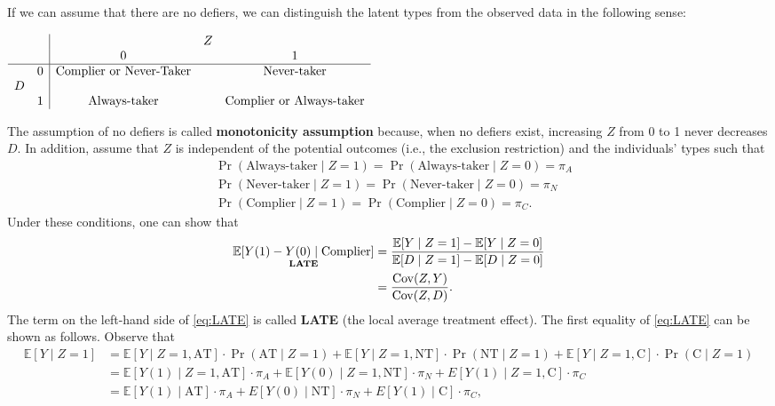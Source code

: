 \documentclass[10.5pt, A4paper, openany, uplatex]{book}
\newcommand{\E}{\mathbb{E}}
\newcommand{\Cov}{\mathrm{Cov}}
\numberwithin{equation}{section}
\begin{document}
If we can assume that there are no defiers, we can distinguish the latent types from the observed data in the following sense: 
\begin{center}
	$
	\begin{array}
	[c]{cc|ccc}
	&  &  & Z & \\
	&  & 0 &  & 1\\\hline
	& 0 & \text{Complier or Never-Taker} &  & \text{Never-taker}\\
	D &  &  &  & \\
	& 1 & \text{Always-taker} &  & \text{Complier or Always-taker}
	\end{array}
	$
\end{center}
The assumption of no defiers is called \textbf{monotonicity assumption} because, when no defiers exist, increasing $Z$ from 0 to 1 never decreases $D$.
In addition, assume that $Z$ is independent of the potential outcomes (i.e., the exclusion restriction) and the individuals' types such that
\begin{align*}
	& \Pr(\text{Always-taker} \mid Z = 1) = \Pr(\text{Always-taker} \mid Z = 0) = \pi_A\\
	& \Pr(\text{Never-taker} \mid Z = 1) = \Pr(\text{Never-taker} \mid Z = 0) = \pi_N\\
	& \Pr(\text{Complier} \mid Z = 1) = \Pr(\text{Complier} \mid Z = 0) = \pi_C.
\end{align*}
Under these conditions, one can show that
\begin{align}\label{eq:LATE}
\begin{split}
	\underset{\text{\bf LATE}}{\E[Y(1) - Y(0) \mid \text{Complier}]} 
	& = \frac{\E[Y \mid Z = 1] - \E[Y \mid Z = 0]}{\E[D \mid Z = 1] - \E[D \mid Z = 0]}\\
	& = \frac{\Cov(Z, Y)}{\Cov(Z, D)}.
\end{split}
\end{align}
The term on the left-hand side of \eqref{eq:LATE} is called \textbf{LATE} (the local average treatment effect).
The first equality of \eqref{eq:LATE} can be shown as follows.
Observe that
\small{\begin{align*}
	\E[Y \mid Z = 1 ] 
	& = \E[Y \mid Z = 1, \text{AT} ] \cdot \Pr(\text{AT} \mid Z = 1) + \E[Y \mid Z = 1, \text{NT} ] \cdot \Pr(\text{NT} \mid Z = 1) + \E[Y \mid Z = 1, \text{C} ] \cdot \Pr(\text{C} \mid Z = 1)\\
	& = \E[Y(1) \mid Z = 1, \text{AT} ] \cdot \pi_A + \E[Y(0) \mid Z = 1, \text{NT} ] \cdot \pi_N + E[Y(1) \mid Z = 1, \text{C} ] \cdot \pi_C\\
	& = \E[Y(1) \mid \text{AT} ] \cdot \pi_A  + E[Y(0) \mid \text{NT} ] \cdot \pi_N  + E[Y(1) \mid \text{C} ] \cdot \pi_C,
\end{align*}}
\end{document}
